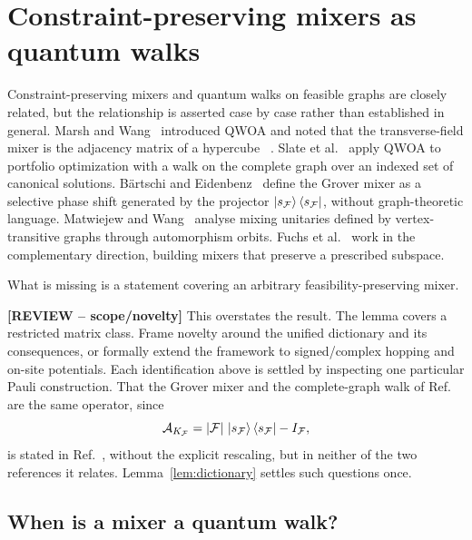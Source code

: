 \section{\label{sec:mixers-as-walks}Constraint-preserving mixers as
quantum walks}

Constraint-preserving mixers and quantum walks on feasible graphs are closely related, but the relationship is asserted case by case rather than established in general. Marsh and Wang~\cite{Marsh2020} introduced QWOA and noted that the transverse-field mixer is the adjacency matrix of a hypercube ~\cite{Marsh2019}. Slate et al.~\cite{Slate2021} apply QWOA to portfolio optimization with a walk on the complete graph over an indexed set of canonical solutions. Bärtschi and Eidenbenz~\cite{Bartschi2020} define the Grover mixer as a selective phase shift generated by the projector $\ket{s_{\mathcal{F}}}\bra{s_{\mathcal{F}}}$, without graph-theoretic language. Matwiejew and Wang~\cite{Matwiejew2024} analyse mixing unitaries defined by vertex-transitive graphs through automorphism orbits. Fuchs et al.~\cite{Fuchs2022,Fuchs2024} work in the complementary direction, building mixers that preserve a prescribed subspace.

What is missing is a statement covering an arbitrary feasibility-preserving mixer.

{\color{red}\textbf{[REVIEW -- scope/novelty]} This overstates the result. The lemma covers a restricted matrix class. Frame novelty around the unified dictionary and its consequences, or formally extend the framework to signed/complex hopping and on-site potentials.} Each identification above is settled by inspecting one particular Pauli construction. That the Grover mixer and the complete-graph walk of Ref.~\cite{Slate2021} are the same operator, since
\begin{equation}
    \mathcal{A}_{K_{\mathcal{F}}} = |\mathcal{F}|\,\ket{s_{\mathcal{F}}}\bra{s_{\mathcal{F}}} - I_{\mathcal{F}} ,
    \label{eq:grover-complete}
\end{equation}
is stated in Ref.~\cite{Bridi2024}, without the explicit rescaling, but in neither of the two references it relates. Lemma~\ref{lem:dictionary} settles such questions once.

\subsection{\label{subsec:dictionary}When is a mixer a quantum walk?}

